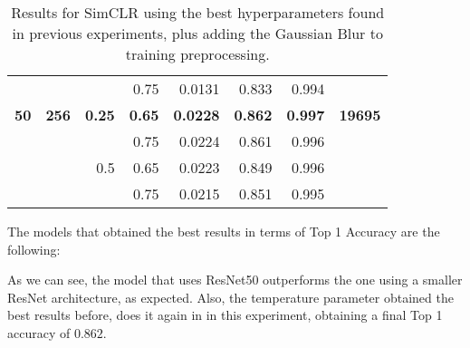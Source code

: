 \begin{table}[H]
{\begin{tabular}{rrrrrrrr}
                  &              &               & 0.75          & 0.0131               & 0.833                   & 0.994                   &                \\
    \textbf{50}   & \textbf{256} & \textbf{0.25} & \textbf{0.65} & \textbf{0.0228}      & \textbf{0.862}          & \textbf{0.997}          & \textbf{19695} \\
                  &              &               & 0.75          & 0.0224               & 0.861                   & 0.996                   &                \\
                  &              & 0.5           & 0.65          & 0.0223               & 0.849                   & 0.996                   &                \\
                  &              &               & 0.75          & 0.0215               & 0.851                   & 0.995                   &               
    \end{tabular}
    }
    \caption{Results for SimCLR using the best hyperparameters found in previous experiments, plus adding the Gaussian Blur to training preprocessing.}
    \label{table:simclr:gridsearch:blur}
    \end{table}


The models that obtained the best results in terms of Top 1 Accuracy are the following:

\begin{table}[H]
    \caption{Best results for the experiment of adding gaussian blur to data augmentation.}
    \label{table:simclr:gridsearch:blur:best}
\end{table}

As we can see, the model that uses ResNet50 outperforms the one using a smaller ResNet architecture, as expected. Also, the temperature parameter obtained the best results before, does it again in in this experiment, obtaining a final Top 1 accuracy of $0.862$.




